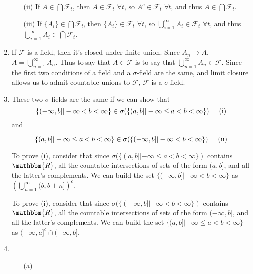 \documentclass[12pt]{article}
\begin{document}
\begin{enumerate}
\begin{itemize}
\item[(ii)] If $A \in \bigcap \mathcal{F}_t$, then $A \in \mathcal{F}_t$ $\forall t$, so $A^c \in \mathcal{F}_t$ $\forall t$, and thus $A \in \bigcap \mathcal{F}_t$.

\item[(iii)] If $\{A_i\} \in \bigcap \mathcal{F}_t$, then $\{A_i\} \in \mathcal{F}_t$ $\forall t$, so $\bigcup^\infty_{i=1} A_i \in \mathcal{F}_t$ $\forall t$, and thus $\bigcup^\infty_{i=1} A_i \in \bigcap \mathcal{F}_t$.

\end{itemize}

\item If $\mathcal{F}$ is a field, then it's closed under finite union. Since $A_n \to A$, $A=\bigcup^\infty_{n=1} A_n$. Thus to say that $A \in \mathcal{F}$ is to say that $\bigcup^\infty_{n=1} A_n \in \mathcal{F}$. Since the first two conditions of a field and a $\sigma$-field are the same, and limit closure allows us to admit countable unions to $\mathcal{F}$, $\mathcal{F}$ is a $\sigma$-field.

\item These two $\sigma$-fields are the same if we can show that $$\{(-\infty,b]| -\infty<b<\infty \} \in \sigma(\{(a,b]| -\infty \leq a<b<\infty \}) \hspace{5mm} \mbox{(i)}$$ and

$$ \{(a,b]| -\infty \leq a<b<\infty \} \in \sigma(\{(-\infty,b]| -\infty<b<\infty \})  \hspace{5mm} \mbox{(ii)}$$

To prove (i), consider that since $\sigma(\{(a,b]| -\infty \leq a<b<\infty \})$ contains $\mathbbm{R}$, all the countable intersections of sets of the form $(a,b]$, and all the latter's complements. We can build the set $\{(-\infty,b]| -\infty<b<\infty \}$ as $ \left( \bigcup^\infty_{n=1}(b,b+n] \right)^c$.

To prove (i), consider that since $\sigma(\{(-\infty,b]| -\infty<b<\infty \})$ contains $\mathbbm{R}$, all the countable intersections of sets of the form $(-\infty,b]$, and all the latter's complements. We can build the set $\{(a,b]| -\infty \leq a<b<\infty \}$ as $(-\infty,a]^c \cap (-\infty,b]$.


\item 

\begin{itemize}
\item[(a)]

\begin{itemize}


\end{itemize}
\end{itemize}
\end{enumerate}
\end{document}
